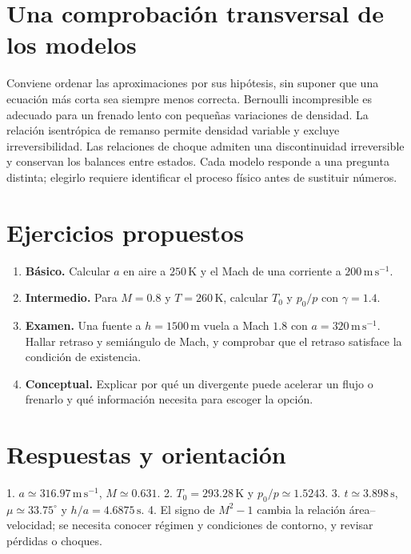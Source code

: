 \section{Una comprobación transversal de los modelos}
Conviene ordenar las aproximaciones por sus hipótesis, sin suponer que una ecuación más corta sea siempre menos correcta. Bernoulli incompresible es adecuado para un frenado lento con pequeñas variaciones de densidad. La relación isentrópica de remanso permite densidad variable y excluye irreversibilidad. Las relaciones de choque admiten una discontinuidad irreversible y conservan los balances entre estados. Cada modelo responde a una pregunta distinta; elegirlo requiere identificar el proceso físico antes de sustituir números.

\section{Ejercicios propuestos}
\begin{enumerate}
\item \textbf{Básico.} Calcular $a$ en aire a $250\,\mathrm{K}$ y el Mach de una corriente a $200\,\mathrm{m\,s^{-1}}$.
\item \textbf{Intermedio.} Para $M=0.8$ y $T=260\,\mathrm{K}$, calcular $T_0$ y $p_0/p$ con $\gamma=1.4$.
\item \textbf{Examen.} Una fuente a $h=1500\,\mathrm{m}$ vuela a Mach $1.8$ con $a=320\,\mathrm{m\,s^{-1}}$. Hallar retraso y semiángulo de Mach, y comprobar que el retraso satisface la condición de existencia.
\item \textbf{Conceptual.} Explicar por qué un divergente puede acelerar un flujo o frenarlo y qué información necesita para escoger la opción.
\end{enumerate}
\section{Respuestas y orientación}
1. $a\simeq316.97\,\mathrm{m\,s^{-1}}$, $M\simeq0.631$. 2. $T_0=293.28\,\mathrm{K}$ y $p_0/p\simeq1.5243$. 3. $t\simeq3.898\,\mathrm{s}$, $\mu\simeq33.75^\circ$ y $h/a=4.6875\,\mathrm{s}$. 4. El signo de $M^2-1$ cambia la relación área--velocidad; se necesita conocer régimen y condiciones de contorno, y revisar pérdidas o choques.

